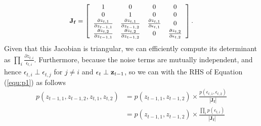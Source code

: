 \begin{equation}
\small
\begin{gathered}\nonumber
    \mathbf{J}_{\mathbf{f}}=\begin{bmatrix}
    \begin{array}{cccc}
        1 & 0 & 0 & 0 \\
        0 & 1 & 0 & 0 \\
        \frac{\partial z_{t,1}}{\partial z_{t-1,1}} & \frac{\partial z_{t,1}}{\partial z_{t-1,2}} & 
        \frac{\partial z_{t,1}}{\partial \epsilon_{t,1}} & 0 \\
        \frac{\partial z_{t,2}}{\partial z_{t-1, 1}} &\frac{\partial z_{t,2}}{\partial z_{t-1,2}} & 0 & \frac{\partial z_{t,2}}{\partial \epsilon_{t,2}}
    \end{array}
    \end{bmatrix}.
\end{gathered}
\end{equation}
Given that this Jacobian is triangular, we can efficiently compute its determinant as $\prod_i \frac{\partial z_{t,i}}{\epsilon_{t,i}}$. Furthermore, because the noise terms are mutually independent, and hence $\epsilon_{t,i} \perp \epsilon_{t,j}$ for $j\neq i$ and $\epsilon_{t} \perp {\mathbf{z}}_{t-1}$, so we can with the RHS of Equation (\ref{equ:p1}) as follows
\begin{equation}
\label{equ:p2}
\begin{array}{rl}
    p(z_{t-1,1}, z_{t-1,2}, z_{t,1}, z_{t,2}) & = p(z_{t-1,1}, z_{t-1,2}) \times \frac{p(\epsilon_{t,1}, \epsilon_{t,2})}{|\mathbf{J}_{\mathbf{f}}|} \\
    & = p(z_{t-1,1}, z_{t-1,2}) \times \frac{\prod_i p(\epsilon_{t,i})}{|\mathbf{J}_{\mathbf{f}}|} \\
\end{array}
\end{equation}

